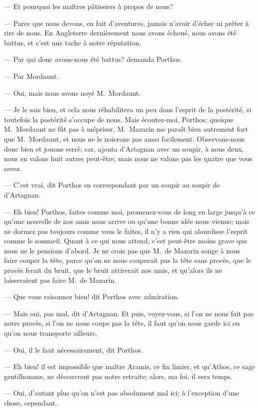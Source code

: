 — Et pourquoi les maîtres pâtissiers à propos de nous?

— Parce que nous devons, en fait d'aventures, jamais n'avoir d'échec ni prêter à rire de nous. En Angleterre dernièrement nous avons échoué, nous avons été battus, et c'est une tache à notre réputation.

— Par qui donc avons-nous été battus? demanda Porthos.

— Par Mordaunt.

— Oui, mais nous avons noyé M.~Mordaunt.

— Je le sais bien, et cela nous réhabilitera un peu dans l'esprit de la postérité, si toutefois la postérité s'occupe de nous. Mais écoutez-moi, Porthos; quoique M.~Mordaunt ne fût pas à mépriser, M.~Mazarin me paraît bien autrement fort que M.~Mordaunt, et nous ne le noierons pas aussi facilement. Observons-nous donc bien et jouons serré; car, ajouta d'Artagnan avec un soupir, à nous deux, nous en valons huit autres peut-être, mais nous ne valons pas les quatre que vous savez.

— C'est vrai, dit Porthos en correspondant par un soupir au soupir de d'Artagnan.

— Eh bien! Porthos, faites comme moi, promenez-vous de long en large jusqu'à ce qu'une nouvelle de nos amis nous arrive ou qu'une bonne idée nous vienne; mais ne dormez pas toujours comme vous le faites, il n'y a rien qui alourdisse l'esprit comme le sommeil. Quant à ce qui nous attend, c'est peut-être moins grave que nous ne le pensions d'abord. Je ne crois pas que M.~de Mazarin songe à nous faire couper la tête, parce qu'on ne nous couperait pas la tête sans procès, que le procès ferait du bruit, que le bruit attirerait nos amis, et qu'alors ils ne laisseraient pas faire M.~de Mazarin.

— Que vous raisonnez bien! dit Porthos avec admiration.

— Mais oui, pas mal, dit d'Artagnan. Et puis, voyez-vous, si l'on ne nous fait pas notre procès, si l'on ne nous coupe pas la tête, il faut qu'on nous garde ici ou qu'on nous transporte ailleurs.

— Oui, il le faut nécessairement, dit Porthos.

— Eh bien! il est impossible que maître Aramis, ce fin limier, et qu'Athos, ce sage gentilhomme, ne découvrent pas notre retraite; alors, ma foi, il sera temps.

— Oui, d'autant plus qu'on n'est pas absolument mal ici; à l'exception d'une chose, cependant.

